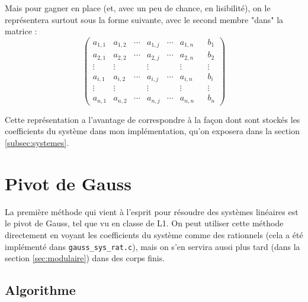\documentclass[french]{article}
\begin{document}
\par
Mais pour gagner en place (et, avec un peu de chance, en lisibilité), on le représentera surtout sous la forme suivante, avec le second membre "dans" la matrice :
\begin{equation*}
	\begin{pmatrix}
		a_{1,1} & a_{1,2} & \cdots & a_{1,j} & \cdots & a_{1,n}&&b_1\\
		a_{2,1} & a_{2,2} & \cdots & a_{2,j} & \cdots & a_{2,n}&&b_2\\
		\vdots  & \vdots  & & \vdots & & \vdots&&\vdots\\
		a_{i,1} & a_{i,2} & \cdots & a_{i,j} & \cdots & a_{i,n}&&b_i\\
		\vdots  & \vdots  &  & \vdots & &\vdots&&\vdots\\
		a_{n,1} & a_{n,2} & \cdots & a_{n,j} & \cdots & a_{n,n}&&b_n
	\end{pmatrix}
\end{equation*}
\par
Cette représentation a l'avantage de correspondre à la façon dont sont stockés les coefficients du système dans mon implémentation, qu'on exposera dans la section \ref{subsec:systemes}.
\vspace{3cm}
\section{Pivot de Gauss} \label{sec:gauss}
La première méthode qui vient à l'esprit pour résoudre des systèmes linéaires est le pivot de Gauss, tel que vu en classe de L1. On peut utiliser cette méthode directement en voyant les coefficients du système comme des rationnels (cela a été implémenté dans {\tt gauss\_sys\_rat.c}), mais on s'en servira aussi plus tard (dans la section \ref{sec:modulaire}) dans des corps finis.
\subsection{Algorithme}
\end{document}
